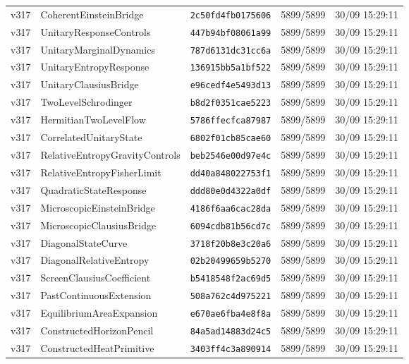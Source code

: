 \documentclass[11pt]{article}
\theoremstyle{definition}\newtheorem{deriv}{Derivação}
\begin{document}
{\begin{longtable}{@{}lllll@{}}
v317 & CoherentEinsteinBridge & \texttt{2c50fd4fb0175606} & 5899/5899 & 30/09 15:29:11 \\
v317 & UnitaryResponseControls & \texttt{447b94bf08061a99} & 5899/5899 & 30/09 15:29:11 \\
v317 & UnitaryMarginalDynamics & \texttt{787d6131dc31cc6a} & 5899/5899 & 30/09 15:29:11 \\
v317 & UnitaryEntropyResponse & \texttt{136915bb5a1bf522} & 5899/5899 & 30/09 15:29:11 \\
v317 & UnitaryClausiusBridge & \texttt{e96cedf4e5493d13} & 5899/5899 & 30/09 15:29:11 \\
v317 & TwoLevelSchrodinger & \texttt{b8d2f0351cae5223} & 5899/5899 & 30/09 15:29:11 \\
v317 & HermitianTwoLevelFlow & \texttt{5786ffecfca87987} & 5899/5899 & 30/09 15:29:11 \\
v317 & CorrelatedUnitaryState & \texttt{6802f01cb85cae60} & 5899/5899 & 30/09 15:29:11 \\
v317 & RelativeEntropyGravityControls & \texttt{beb2546e00d97e4c} & 5899/5899 & 30/09 15:29:11 \\
v317 & RelativeEntropyFisherLimit & \texttt{dd40a848022753f1} & 5899/5899 & 30/09 15:29:11 \\
v317 & QuadraticStateResponse & \texttt{ddd80e0d4322a0df} & 5899/5899 & 30/09 15:29:11 \\
v317 & MicroscopicEinsteinBridge & \texttt{4186f6aa6cac28da} & 5899/5899 & 30/09 15:29:11 \\
v317 & MicroscopicClausiusBridge & \texttt{6094cdb81b56cd7c} & 5899/5899 & 30/09 15:29:11 \\
v317 & DiagonalStateCurve & \texttt{3718f20b8e3c20a6} & 5899/5899 & 30/09 15:29:11 \\
v317 & DiagonalRelativeEntropy & \texttt{02b20499659b5270} & 5899/5899 & 30/09 15:29:11 \\
v317 & ScreenClausiusCoefficient & \texttt{b5418548f2ac69d5} & 5899/5899 & 30/09 15:29:11 \\
v317 & PastContinuousExtension & \texttt{508a762c4d975221} & 5899/5899 & 30/09 15:29:11 \\
v317 & EquilibriumAreaExpansion & \texttt{e670ae6fba4e8f8a} & 5899/5899 & 30/09 15:29:11 \\
v317 & ConstructedHorizonPencil & \texttt{84a5ad14883d24c5} & 5899/5899 & 30/09 15:29:11 \\
v317 & ConstructedHeatPrimitive & \texttt{3403ff4c3a890914} & 5899/5899 & 30/09 15:29:11 \\

\end{longtable}}
\end{document}
